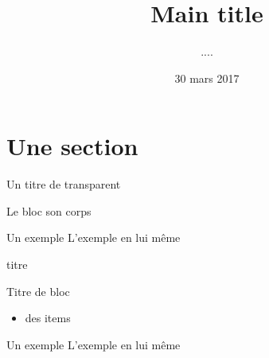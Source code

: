 \documentclass{beamer}
\title[Short title]{Main title} %
\author{....} %
\institute{}
\date{30 mars 2017}
\newcommand{\befitem}{\vspace{-0.6cm}}
\begin{document}
{
\frame{
\thispagestyle{empty}
\titlepage}}
\LogoOff{}


\section{Une section}
\begin{frame}{Un titre de transparent}
	\begin{block}{Le bloc}
        son corps
	\end{block}
	
	\begin{exampleblock}{Un exemple}
	    L'exemple en lui même
	\end{exampleblock}
\end{frame}

\begin{frame}{titre}	
	\begin{block}{Titre de bloc}\befitem
		\begin{itemize}
		\item des items
		\end{itemize}
	\end{block}
	
	\begin{exampleblock}{Un exemple}
        L'exemple en lui même
	\end{exampleblock}
\end{frame}
\end{document}
